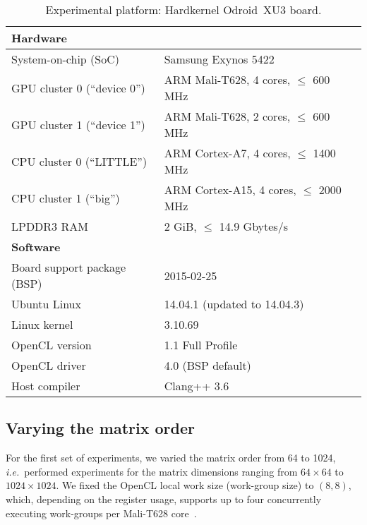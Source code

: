 \documentclass{acm_proc_article-sp} %
\begin{document}
\begin{table*}
\centering
\caption{\label{Odroid}Experimental platform: Hardkernel Odroid~XU3 board.}
  \begin{tabular}{ll}
  \toprule
  {\bf Hardware}   &\\
  \midrule
  System-on-chip (SoC)         & Samsung Exynos 5422                     \\
  GPU cluster 0 (``device 0'') & ARM Mali-T628,  4 cores, $\le$ 600 MHz  \\
  GPU cluster 1 (``device 1'') & ARM Mali-T628,  2 cores, $\le$ 600 MHz  \\
  CPU cluster 0 (``LITTLE'')   & ARM Cortex-A7,  4 cores, $\le$ 1400 MHz \\
  CPU cluster 1 (``big'')      & ARM Cortex-A15, 4 cores, $\le$ 2000 MHz \\
  LPDDR3 RAM                   & 2 GiB, $\le$ 14.9 Gbytes/s              \\
  \midrule
  {\bf Software}   &\\
  \midrule
  Board support package (BSP)  & 2015-02-25                    \\
  Ubuntu Linux                 & 14.04.1 (updated to 14.04.3)  \\
  Linux kernel                 & 3.10.69                       \\
  OpenCL version               & 1.1 Full Profile              \\
  OpenCL driver                & 4.0 (BSP default)             \\
  Host compiler                & Clang++ 3.6                   \\
  \bottomrule
  \end{tabular}
\end{table*}


\subsection{Varying the matrix order}
\label{sec:order}

For the first set of experiments, we varied the matrix order from 64 to 1024,
{\em i.e.}\ performed experiments for the matrix dimensions ranging from $64
\times 64$ to $1024 \times 1024$.
%
We fixed the OpenCL local work size (work-group size) to $(8,8)$, which,
depending on the register usage, supports up to four concurrently executing
work-groups per Mali-T628 core~\cite{Gronqvist:2014}.
\end{document}
